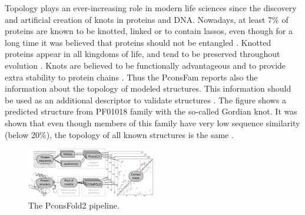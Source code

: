 \documentclass[a4,center,fleqn]{NAR}
\begin{document}
Topology plays an ever-increasing role in modern life sciences since
the discovery and artificial creation of knots in proteins and DNA.
Nowadays, at least 7\% of proteins are known to be knotted, linked or
to contain lassos, even though for a long time it was believed that
proteins should not be entangled \cite{sulkowska2018entangled}. Knotted proteins appear in all
kingdoms of life, and tend to be preserved throughout evolution \cite{sulkowska2012conservation}. 
Knots are believed to be functionally advantageous and to provide extra
stability to protein chains \cite{christian2016methyl}.
Thus the PconsFam reports also the information about the topology of
modeled structures. This information should be used as an additional
descriptor to validate structures \cite{khatib2006rapid}. The figure shows a
predicted structure from PF01018 family with the so-called Gordian
knot. It was shown that even though members of this family have very
low sequence similarity (below 20\%), the topology of all known
structures is the same \cite{sulkowska2012conservation}.



\begin{figure}[t]
\begin{center}
\end{center}
    \includegraphics[width=0.5\textwidth]{figures/flowchart.eps}
\caption{The PconsFold2 pipeline.}
\label{fig:Pipeline}
\end{figure}
\end{document}
